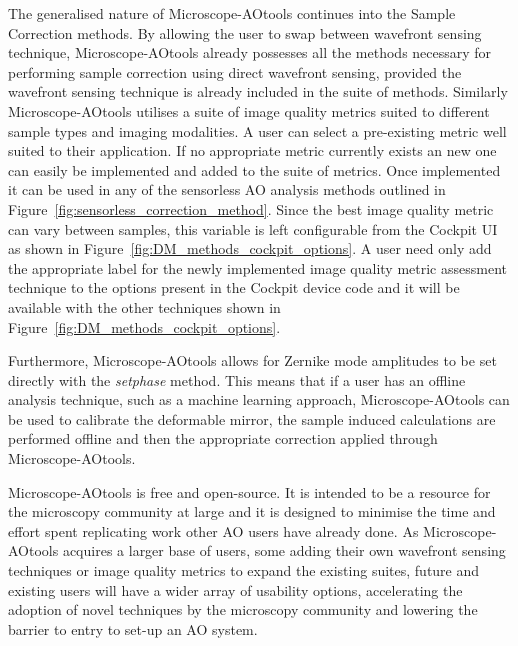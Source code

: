 The generalised nature of Microscope-AOtools continues into the Sample 
Correction methods. By allowing the user to swap between wavefront sensing 
technique, Microscope-AOtools already possesses all the methods necessary 
for performing sample correction using direct wavefront sensing, provided 
the wavefront sensing technique is already included in the suite of 
methods. Similarly Microscope-AOtools utilises a suite of image quality 
metrics suited to different sample types and imaging modalities. A user can 
select a pre-existing metric well suited to their application. If no 
appropriate metric currently exists an new one can easily be implemented 
and added  to the suite of metrics. Once implemented it can be used in any 
of the sensorless AO analysis methods outlined in 
Figure~\ref{fig:sensorless_correction_method}. Since the best image quality 
metric can vary between samples, this variable is left configurable from 
the Cockpit UI as shown in Figure~\ref{fig:DM_methods_cockpit_options}. A 
user need only add the appropriate label for the newly implemented image 
quality metric assessment technique to the options present in the Cockpit 
device code and it will be available with the other techniques shown in 
Figure~\ref{fig:DM_methods_cockpit_options}.

Furthermore, Microscope-AOtools allows for Zernike mode amplitudes to be 
set directly with the \textit{set\textunderscore phase} method. This means 
that if a user has an offline analysis technique, such as a machine 
learning approach, Microscope-AOtools can be used to calibrate the 
deformable mirror, the sample induced calculations are performed offline 
and then the appropriate correction applied through Microscope-AOtools.

Microscope-AOtools is free and open-source. It is intended to be a resource 
for the microscopy community at large and it is designed to minimise the 
time and effort spent replicating work other AO users have already done. As 
Microscope-AOtools acquires a larger base of users, some adding their own 
wavefront sensing techniques or image quality metrics to expand the 
existing suites, future and existing users will have a wider array of 
usability options, accelerating the adoption of novel techniques by the 
microscopy community and lowering the barrier to entry to set-up an AO 
system.

